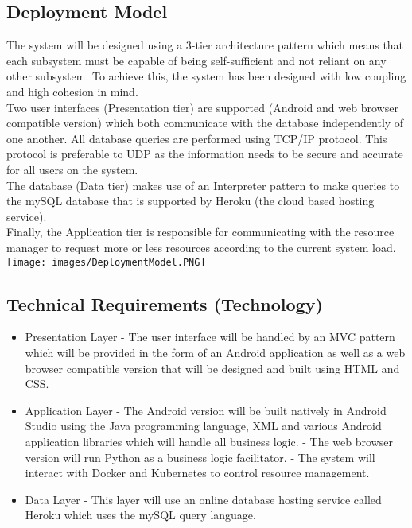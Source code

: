 \documentclass[11pt]{article}
\begin{document}
\subsection{Deployment Model}
The system will be designed using a 3-tier architecture pattern which means that each subsystem must be capable of being self-sufficient and not reliant on any other subsystem. To achieve this, the system has been designed with low coupling and high cohesion in mind.\\[0.5cm]
Two user interfaces (Presentation tier) are supported (Android and web browser compatible version) which both communicate with the database independently of one another. All database queries are performed using TCP/IP protocol. This protocol is preferable to UDP as the information needs to be secure and accurate for all users on the system.\\[0.5cm]
The database (Data tier) makes use of an Interpreter pattern to make queries to the mySQL database that is supported by Heroku (the cloud based hosting service).\\[0.5cm]
Finally, the Application tier is responsible for communicating with the resource manager to request more or less resources according to the current system load.\\[0.5cm]
\texttt{[image: images/DeploymentModel.PNG]}
\newpage
\subsection{Technical Requirements (Technology)} \label{technical}
\begin{itemize}
        \item Presentation Layer
            \subitem - The user interface will be handled by an MVC pattern which will be provided in the form of an Android application as well as a web browser compatible version that will be designed and built using HTML and CSS.
        \item Application Layer
            \subitem - The Android version will be built natively in Android Studio using the Java programming language, XML and various Android application libraries which will handle all business logic.
            \subitem - The web browser version will run Python as a business logic facilitator.
            \subitem - The system will interact with Docker and Kubernetes to control resource management.
        \item Data Layer
            \subitem - This layer will use an online database hosting service called Heroku which uses the mySQL query language.
    \end{itemize}
\end{document}
